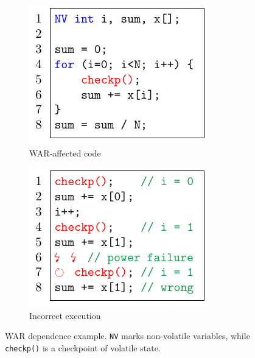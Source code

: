 \begin{figure}
    \begin{subfigure}{0.49\columnwidth}
        \includegraphics[width=\columnwidth]{figures/war-example.pdf}
        \caption{WAR-affected code}
        \label{fig:war-example}
    \end{subfigure}
    \begin{subfigure}{0.49\columnwidth}
        \includegraphics[width=\columnwidth]{figures/war-execution.pdf}
        \caption{Incorrect execution}
        \label{fig:war-execution}
    \end{subfigure}
    \caption{WAR dependence example. \texttt{NV} marks non-volatile variables,
    while \texttt{checkp()} is a checkpoint of volatile state.}
    \label{fig:war}
\end{figure}

